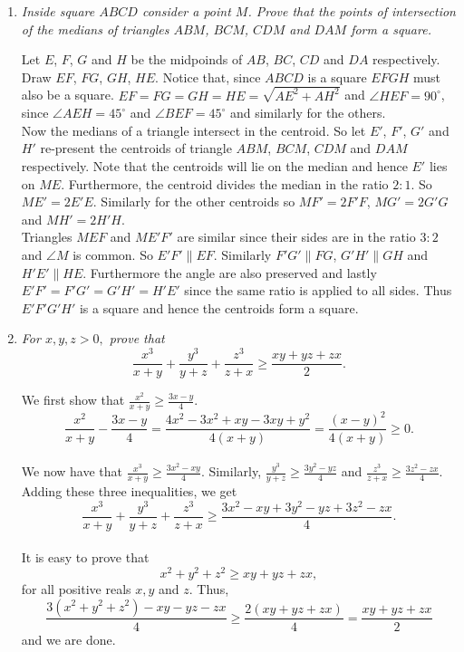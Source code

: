 \documentclass{article}
\begin{document}
\begin{enumerate}[1.]
\vspace{24pt}
\item %
{\itshape Inside square $ABCD$ consider a point $M$. Prove that the points of intersection of the medians of triangles $ABM$, $BCM$, $CDM$ and $DAM$ form a square.}

Let $E$, $F$, $G$ and $H$ be the midpoinds of $AB$, $BC$, $CD$ and $DA$ respectively. Draw $EF$, $FG$, $GH$, $HE$. Notice that, since $ABCD$ is a square $EFGH$ must also be a square. $EF=FG=GH=HE = \sqrt{AE^2+AH^2}$ and $\angle HEF = 90^{\circ}$, since $\angle AEH = 45^{\circ}$ and $\angle BEF = 45^{\circ}$ and similarly for the others.\\
\newline
Now the medians of a triangle intersect in the centroid. So let $E'$, $F'$, $G'$ and $H'$ re-present the centroids of triangle $ABM$, $BCM$, $CDM$ and $DAM$ respectively. Note that the centroids will lie on the median and hence $E'$ lies on $ME$. Furthermore, the centroid divides the median in the ratio $2:1$. So $ME'= 2E'E$. Similarly for the other centroids so $MF' = 2F'F$, $MG' = 2G'G$ and $MH' = 2H'H$.\\
\newline
Triangles $MEF$ and $ME'F'$ are similar since their sides are in the ratio $3:2$ and $\angle M$ is common. So $E'F' \parallel EF$. Similarly $F'G' \parallel FG$, $G'H' \parallel GH$ and $H'E' \parallel HE$. Furthermore the angle are also preserved and lastly $E'F'=F'G'=G'H'=H'E'$ since the same ratio is applied to all sides. Thus $E'F'G'H'$ is a square and hence the centroids form a square.

\vspace{24pt}
\item %
{\itshape For $x,y,z >0,$ prove that $$\frac{x^3}{x+y}+\frac{y^3}{y+z} + \frac{z^3}{z+x} \geq \frac{xy+yz+zx}{2}.$$}


We first show that $\displaystyle\frac{x^2}{x+y} \geq \frac{3x-y}{4}.$ $$\frac{x^2}{x+y}-\frac{3x-y}{4} = \frac{4x^2 - 3x^2 + xy - 3xy + y^2}{4(x+y)} = \frac{(x-y)^2}{4(x+y)} \geq 0.$$ \\ We now have that $\displaystyle \frac{x^3}{x+y} \geq \frac{3x^2-xy}{4}.$ Similarly, $\displaystyle\frac{y^3}{y+z} \geq \frac{3y^2-yz}{4}$ and $\displaystyle\frac{z^3}{z+x} \geq \frac{3z^2-zx}{4}.$ Adding these three inequalities, we get $$\displaystyle\frac{x^3}{x+y} + \frac{y^3}{y+z} + \frac{z^3}{z+x} \geq \frac{3x^2 - xy + 3y^2 - yz + 3z^2 - zx}{4}.$$\\
It is easy to prove that $$x^2 + y^2 + z^2 \geq xy + yz + zx,$$ for all positive reals $x,y$ and $z$. Thus, $$\frac{3(x^2 + y^2 + z^2) - xy -yz -zx}{4} \geq \frac{2(xy+yz+zx)}{4} = \frac{xy+yz+zx}{2}$$ and we are done.



\end{enumerate}
\end{document}

